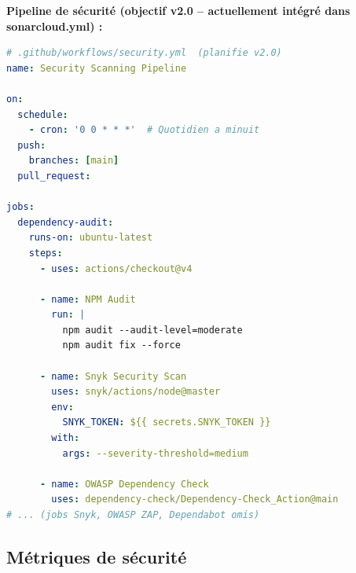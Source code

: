 \begin{exemple}
\textbf{Pipeline de sécurité (objectif v2.0 -- actuellement intégré dans sonarcloud.yml) :}
\begin{lstlisting}[language=yaml]
# .github/workflows/security.yml  (planifie v2.0)
name: Security Scanning Pipeline

on:
  schedule:
    - cron: '0 0 * * *'  # Quotidien a minuit
  push:
    branches: [main]
  pull_request:

jobs:
  dependency-audit:
    runs-on: ubuntu-latest
    steps:
      - uses: actions/checkout@v4
      
      - name: NPM Audit
        run: |
          npm audit --audit-level=moderate
          npm audit fix --force
          
      - name: Snyk Security Scan
        uses: snyk/actions/node@master
        env:
          SNYK_TOKEN: ${{ secrets.SNYK_TOKEN }}
        with:
          args: --severity-threshold=medium
          
      - name: OWASP Dependency Check
        uses: dependency-check/Dependency-Check_Action@main
# ... (jobs Snyk, OWASP ZAP, Dependabot omis)
\end{lstlisting}
\end{exemple}

\subsection{Métriques de sécurité}


